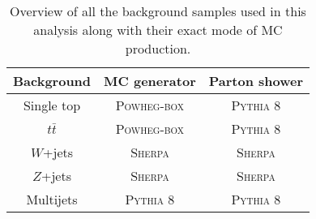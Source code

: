  \begin{table}[hbt!]
 	\centering
 	\begin{tabular}{c | c | c} 
 		\toprule
 		Background & MC generator & Parton shower \\ [0.5ex]
 		\midrule
 		Single top & \textsc{Powheg-box} & \textsc{Pythia 8} \\
 		$t\bar{t}$ & \textsc{Powheg-box} & \textsc{Pythia 8} \\
 		$W$+jets & \textsc{Sherpa} & \textsc{Sherpa} \\ 
 		$Z$+jets & \textsc{Sherpa} & \textsc{Sherpa} \\ 
 		Multijets & \textsc{Pythia 8} & \textsc{Pythia 8} \\ 
 		\bottomrule
 	\end{tabular}
 	\caption{Overview of all the background samples used in this analysis along with their exact mode of MC production.}
 	\label{table:analysisstrategy:mc:background}
 \end{table}

